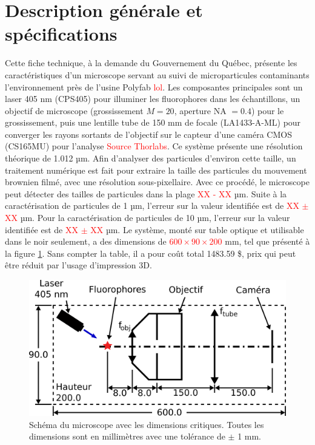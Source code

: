 \documentclass[11pt,letterpaper]{article}
\begin{document}

\section{Description générale et spécifications}

Cette fiche technique, à la demande du Gouvernement du Québec, présente les caractéristiques 
d'un microscope servant au suivi de microparticules contaminants l'environnement près de 
l'usine Polyfab \textcolor{red}{lol}. Les composantes principales sont un laser 405 nm (CPS405)
pour illuminer les fluorophores dans les échantillons, un objectif de microscope (grossissement 
$M = 20$, aperture NA $= 0.4$) pour le grossissement, puis une lentille tube de 150 mm de focale
(LA1433-A-ML) pour converger les rayons sortants de l'objectif sur le capteur d'une caméra CMOS 
(CS165MU) pour l'analyse \textcolor{red}{Source Thorlabs}. Ce système présente une résolution
théorique de 1.012 µm. Afin d'analyser des particules d'environ cette taille, un traitement
numérique est fait pour extraire la taille des particules du mouvement brownien filmé, avec 
une résolution sous-pixellaire. Avec ce procédé, le microscope peut détecter des tailles de 
particules dans la plage  \textcolor{red}{XX - XX} µm. Suite à la caractérisation de particules 
de 1 µm, l'erreur sur la valeur identifiée est de \textcolor{red}{XX $\pm$ XX} µm.
Pour la caractérisation de particules de 10 µm, l'erreur sur la valeur identifiée est de 
\textcolor{red}{XX $\pm$ XX} µm. Le système, monté sur table optique et utilisable dans le noir 
seulement, a des dimensions de \textcolor{red}{$600 \times 90 \times 200$} mm, tel que présenté à 
la figure \ref{schema_micro}. Sans compter la table, il a pour coût total 1483.59 \$, prix qui
peut être réduit par l'usage d'impression 3D.


\begin{figure}[H]
  \centering
  \includegraphics[scale=2.8]{schema_fiche_tech.png}
  \caption{Schéma du microscope avec les dimensions critiques. Toutes les dimensions sont en millimètres avec une tolérance de $\pm$ 1 mm.}
  \label{schema_micro}
\end{figure}
\end{document}
